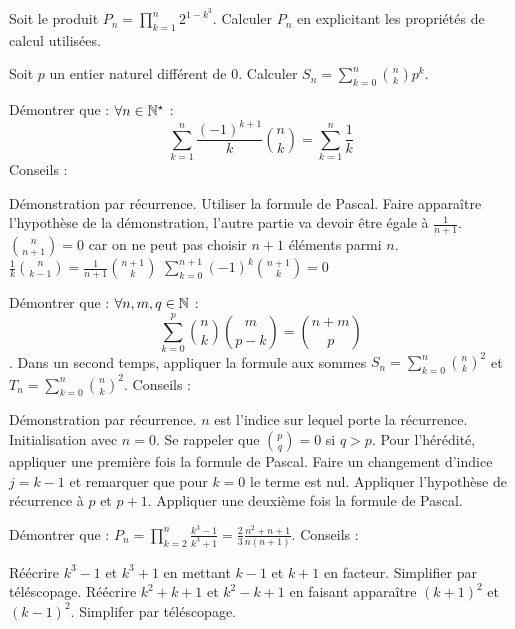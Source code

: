 \begin{exercise}[subtitle= Lien produit-somme et  propriétés des produits, difficulty=**]
	Soit le produit $P_n = \prod\limits_{k=1}^{n}2^{1-k^3}$. Calculer $P_n$ en explicitant les propriétés de calcul utilisées. 
\end{exercise}


\begin{exercise}[subtitle= Binôme et somme, difficulty=*]
	Soit $p$ un entier naturel différent de 0. Calculer  $S_n = \sum\limits_{k=0}^{n}\binom{n}{k}p^{k}$.  
\end{exercise}

\begin{exercise}[subtitle= Binôme - sommes - récurrences, difficulty=$\spadesuit\spadesuit$]
Démontrer que : $\forall n \in \mathbb{N}^\star$ :
$$\sum\limits_{k=1}^{n}\frac{(-1)^{k+1}}{k}\binom{n}{k} = \sum\limits_{k=1}^n \frac{1}{k}$$ 
Conseils :
\begin{tasks} 
	\task Démonstration par récurrence. 
	\task Utiliser la formule de Pascal. 
	\task Faire apparaître l'hypothèse de la démonstration, l'autre partie va devoir être égale à $\frac{1}{n+1}$.
	\task $\binom{n}{n+1}=0$ car on ne peut pas choisir $n+1$ éléments parmi $n$.
	\task $\frac{1}{k}\binom{n}{k-1} = \frac{1}{n+1}\binom{n+1}{k} $
	\task $\sum\limits_{k=0}^{n+1} (-1)^{k}\binom{n+1}{k} = 0$ 
\end{tasks} 
\end{exercise}


\begin{exercise}[subtitle= Formule de Van Der Monde, difficulty=$\spadesuit\spadesuit$]
	Démontrer que : $\forall n, m, q \in \mathbb{N}$ :
	$$\sum\limits_{k=0}^{p}\binom{n}{k} \binom{m}{p-k} = \binom{n+m}{p}$$.  Dans un second temps, appliquer la formule aux sommes $S_n = \sum\limits_{k=0}^n \binom{n}{k}^2$ et $T_n = \sum\limits_{k=0}^n \binom{n}{k}^2$.
	Conseils :
	\begin{tasks} 
		\task Démonstration par récurrence. 
		\task $n$ est l'indice sur lequel porte la récurrence. 
		\task Initialisation avec $n=0$. Se rappeler que $\binom{p}{q} = 0 $ si $q>p$.
		\task Pour l'hérédité, appliquer une première fois la formule de Pascal. 
		\task Faire un changement d'indice $j=k-1$ et remarquer que pour $k=0$ le terme est nul. 
		\task Appliquer l'hypothèse de récurrence à $p$ et $p+1$.
		\task Appliquer une deuxième fois la formule de Pascal. 
	\end{tasks} 
\end{exercise}


\begin{exercise}[subtitle= Produit et téléscopages, difficulty=$\spadesuit$]
	Démontrer que : $P_n =\prod\limits_{k=2}^n \frac{k^3-1}{k^3+1} = \frac{2}{3}\frac{n^2 +n +1}{n(n+1)}$.
	Conseils :
	\begin{tasks} 
		\task Réécrire $k^3-1$ et $k^3+1$ en mettant $k-1$ et $k+1$ en facteur.
		\task Simplifier par téléscopage.
		\task Réécrire $k^2+k+1$  et $k^2-k+1$ en faisant apparaître $(k+1)^2$ et $(k-1)^2$. 
		\task Simplifer par téléscopage.  
	\end{tasks} 
\end{exercise}



